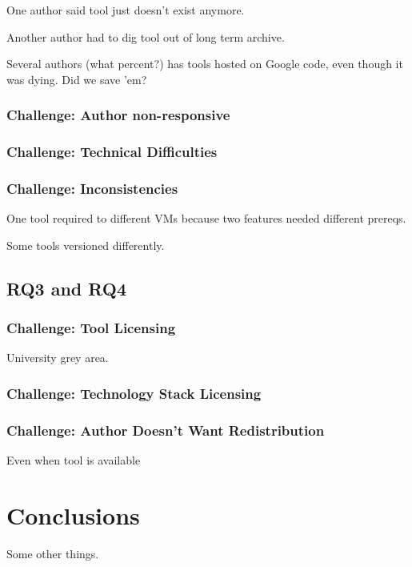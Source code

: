\documentclass{sig-alternate-05-2015}
\begin{document}
One author said tool just doesn't exist anymore.

Another author had to dig tool out of long term archive.

Several authors (what percent?) has tools hosted on Google code, even though it was dying.
Did we save 'em?

\subsubsection{Challenge: Author non-responsive}


\subsubsection{Challenge: Technical Difficulties}

\subsubsection{Challenge: Inconsistencies}

One tool required to different VMs because two features needed different prereqs.

Some tools versioned differently.

\subsection{RQ3 and RQ4}


\subsubsection{Challenge: Tool Licensing}

University grey area.

\subsubsection{Challenge: Technology Stack Licensing}

\subsubsection{Challenge: Author Doesn't Want Redistribution}

Even when tool is available

\section{Conclusions}

Some other things.





\end{document}

